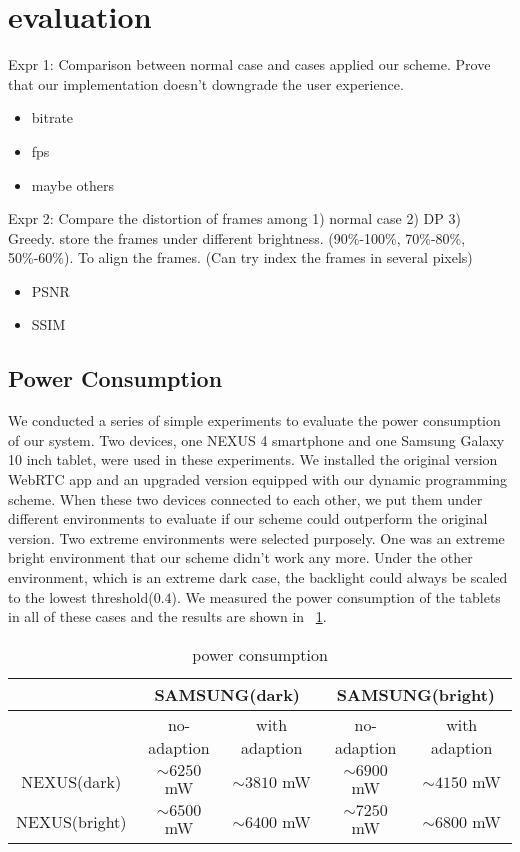 \section{evaluation}

Expr 1:
Comparison between normal case and cases applied our scheme.
Prove that our implementation doesn't downgrade the user experience.
\begin{itemize}
  \item{bitrate}
  \item{fps}
  \item{maybe others}
\end{itemize}

Expr 2:
Compare the distortion of frames among 1) normal case 2) DP 3)
Greedy. store the frames under different brightness. (90\%-100\%,
70\%-80\%, 50\%-60\%).
To align the frames. (Can try index the frames in several pixels)
\begin{itemize}
  \item{PSNR}
  \item{SSIM}
\end{itemize}


\subsection{Power Consumption}
We conducted a series of simple experiments to evaluate the power
consumption of our system. Two devices, one NEXUS 4 smartphone and one
Samsung Galaxy 10 inch tablet, were used in these experiments. We
installed the original version WebRTC app and an upgraded version
equipped with our dynamic programming scheme. When these two devices
connected to each other, we put them under different environments to
evaluate if our scheme could outperform the original version. Two
extreme environments were selected purposely. One was an extreme
bright environment that our scheme didn't work any more. Under the
other environment, which is an extreme dark case, the backlight could
always be scaled to the lowest threshold($0.4$). We measured the power
consumption of the tablets in all of these cases and the results are
shown in ~\ref{tab:power_consumption}.


\begin{table}[h]
  \centering
  \caption{power consumption}
  \label{tab:power_consumption}
  \begin{tabular}{|c|c|c|c|c|} %
    \hline
    & \multicolumn{2}{|c|}{SAMSUNG(dark)} & \multicolumn{2}{|c|}{SAMSUNG(bright)} \\ \hline
    & no-adaption & with adaption & no-adaption & with adaption \\ \hline
    NEXUS(dark) & $\sim{6250}$ mW & $\sim{3810}$ mW & $\sim{6900}$ mW & $\sim{4150}$ mW  \\ \hline
    NEXUS(bright) & $\sim{6500}$ mW & $\sim{6400}$ mW & $\sim{7250}$ mW & $\sim{6800}$ mW \\ \hline
  \end{tabular}
  
\end{table}

